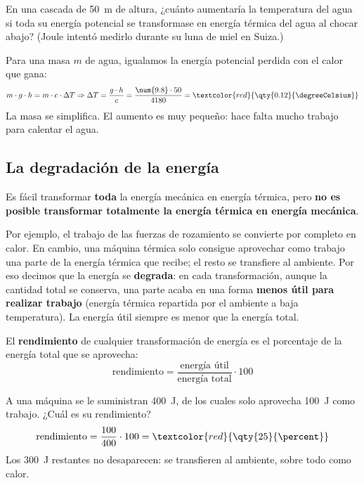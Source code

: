 \begin{example}
    En una cascada de \qty{50}{\m} de altura, ¿cuánto aumentaría la temperatura del agua si toda su energía potencial se transformase en energía térmica del agua al chocar abajo? (Joule intentó medirlo durante su luna de miel en Suiza.)

    Para una masa \(m\) de agua, igualamos la energía potencial perdida con el calor que gana:
    \[ m \cdot g \cdot h = m \cdot c \cdot \Delta T \Rightarrow \Delta T = \frac{g \cdot h}{c} = \frac{\num{9.8} \cdot 50}{4180} = \textcolor{red}{\qty{0.12}{\degreeCelsius}} \]
    La masa se simplifica. El aumento es muy pequeño: hace falta mucho trabajo para calentar el agua.
\end{example}

\subsection{La degradación de la energía}

\begin{marker}
    Es fácil transformar \textbf{toda} la energía mecánica en energía térmica, pero \textbf{no es posible transformar totalmente la energía térmica en energía mecánica}.
\end{marker}

Por ejemplo, el trabajo de las fuerzas de rozamiento se convierte por completo en calor. En cambio, una máquina térmica solo consigue aprovechar como trabajo una parte de la energía térmica que recibe; el resto se transfiere al ambiente. Por eso decimos que la energía se \textbf{degrada}: en cada transformación, aunque la cantidad total se conserva, una parte acaba en una forma \textbf{menos útil para realizar trabajo} (energía térmica repartida por el ambiente a baja temperatura). La energía útil siempre es menor que la energía total.

\begin{definition}[Rendimiento]
    El \textbf{rendimiento} de cualquier transformación de energía es el porcentaje de la energía total que se aprovecha:
    \[ \text{rendimiento} = \frac{\text{energía útil}}{\text{energía total}} \cdot 100 \]
\end{definition}

\begin{example}
    A una máquina se le suministran \qty{400}{\joule}, de los cuales solo aprovecha \qty{100}{\joule} como trabajo. ¿Cuál es su rendimiento?
    \[ \text{rendimiento} = \frac{100}{400} \cdot 100 = \textcolor{red}{\qty{25}{\percent}} \]
    Los \qty{300}{\joule} restantes no desaparecen: se transfieren al ambiente, sobre todo como calor.
\end{example}

